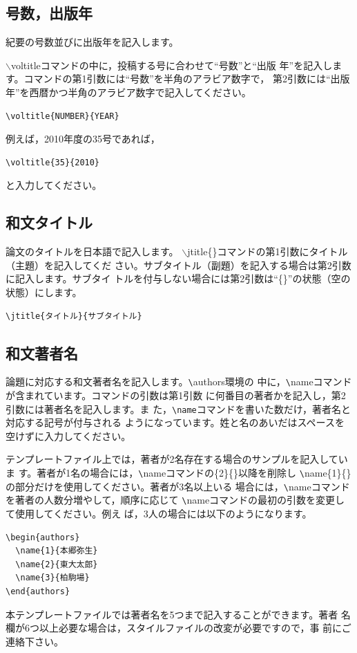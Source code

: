 \documentclass[b5paper,10pt,twocolumn,tombow]{jarticle}
\begin{document}
\subsection{号数，出版年}
紀要の号数並びに出版年を記入します。

$\backslash$voltitleコマンドの中に，投稿する号に合わせて``号数''と``出版
年''を記入します。コマンドの第1引数には``号数''を半角のアラビア数字で，
第2引数には``出版年''を西暦かつ半角のアラビア数字で記入してください。
\begin{verbatim}
\voltitle{NUMBER}{YEAR}
\end{verbatim}


例えば，2010年度の35号であれば，
\begin{verbatim}
\voltitle{35}{2010}
\end{verbatim}
と入力してください。

\subsection{和文タイトル}
論文のタイトルを日本語で記入します。
$\backslash$jtitle\{\}コマンドの第1引数にタイトル（主題）を記入してくだ
さい。サブタイトル（副題）を記入する場合は第2引数に記入します。サブタイ
トルを付与しない場合には第2引数は``\{\}''の状態（空の状態）にします。
\begin{verbatim}
\jtitle{タイトル}{サブタイトル}
\end{verbatim}

\subsection{和文著者名}
論題に対応する和文著者名を記入します。\verb|\|authors環境の
中に，\verb|\|nameコマンドが含まれています。コマンドの引数は第1引数
に何番目の著者かを記入し，第2引数には著者名を記入します。ま
た，\verb|\name|コマンドを書いた数だけ，著者名と対応する記号が付与される
ようになっています。姓と名のあいだはスペースを空けずに入力してください。

テンプレートファイル上では，著者が2名存在する場合のサンプルを記入していま
す。著者が1名の場合には，\verb|\|nameコマンドの\{2\}\{\}以降を削除し
\verb|\|name\{1\}\{\}の部分だけを使用してください。著者が3名以上いる
場合には，\verb|\|nameコマンドを著者の人数分増やして，順序に応じて
\verb|\|nameコマンドの最初の引数を変更して使用してください。例え
ば，3人の場合には以下のようになります。
\begin{verbatim}
\begin{authors}
  \name{1}{本郷弥生}
  \name{2}{東大太郎}
  \name{3}{柏駒場}
\end{authors}
\end{verbatim}
本テンプレートファイルでは著者名を5つまで記入することができます。著者
名欄が6つ以上必要な場合は，スタイルファイルの改変が必要ですので，事
前にご連絡下さい。
\end{document}
